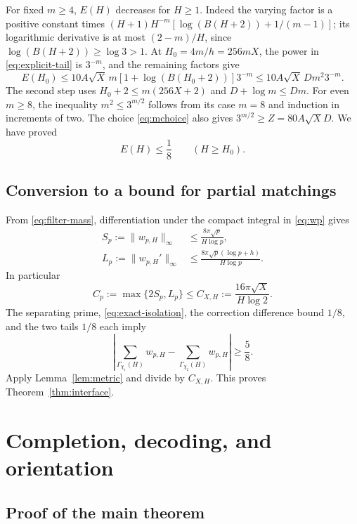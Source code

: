 \documentclass[11pt,letterpaper]{article}
\theoremstyle{definition}\newtheorem{definition}[theorem]{Definition}
\theoremstyle{remark}\newtheorem{remark}[theorem]{Remark}
\begin{document}
For fixed $m\ge4$, $E(H)$ decreases for $H\ge1$. Indeed the varying
factor is a positive constant times
$(H+1)H^{-m}[\log(B(H+2))+1/(m-1)]$; its logarithmic derivative is
at most $(2-m)/H$, since $\log(B(H+2))\ge\log3>1$.
At $H_0=4m/h=256mX$, the power in \eqref{eq:explicit-tail} is
$3^{-m}$, and the remaining factors give
\[
 E(H_0)\le10A\sqrt X\,m[1+\log(B(H_0+2))]3^{-m}
          \le10A\sqrt X\,D m^2 3^{-m}.
\]
The second step uses $H_0+2\le m(256X+2)$ and
$D+\log m\le Dm$.
For even $m\ge8$, the inequality $m^2\le3^{m/2}$ follows from its
case $m=8$ and induction in increments of two. The choice
\eqref{eq:mchoice} also gives $3^{m/2}\ge Z=80A\sqrt X D$.
We have proved
\begin{equation}\label{eq:tail-eighth}
 \boxed{\displaystyle E(H)\le\frac18\qquad(H\ge H_0).}
\end{equation}

\subsection{Conversion to a bound for partial matchings}

From \eqref{eq:filter-mass}, differentiation under the compact integral
in \eqref{eq:wp} gives
\begin{align*}
 S_p:=\|w_{p,H}\|_\infty
 &\le\frac{8\pi\sqrt p}{H\log p},\\
 L_p:=\|w_{p,H}'\|_\infty
 &\le\frac{8\pi\sqrt p(\log p+h)}{H\log p}.
\end{align*}
In particular
\begin{equation}\label{eq:test-constant}
 C_p:=\max\{2S_p,L_p\}\le C_{X,H}:=\frac{16\pi\sqrt X}{H\log2}.
\end{equation}
The separating prime, \eqref{eq:exact-isolation}, the correction
difference bound $1/8$, and the two tails $1/8$ each imply
\[
 \left|\sum_{\Gamma_{\chi_1}(H)}w_{p,H}
        -\sum_{\Gamma_{\chi_2}(H)}w_{p,H}\right|\ge\frac58.
\]
Apply Lemma~\ref{lem:metric} and divide by $C_{X,H}$. This proves
Theorem~\ref{thm:interface}.

\section{Completion, decoding, and orientation}

\subsection{Proof of the main theorem}
\end{document}
